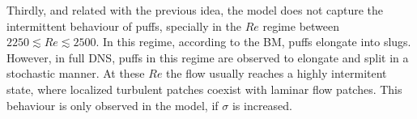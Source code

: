 \documentclass{article}
\begin{document}
Thirdly, and related with the previous idea, the model does not capture the intermittent behaviour of puffs, specially in the $Re$ regime between $2250 \lesssim Re \lesssim 2500$. In this regime, according to the BM, puffs elongate into slugs. However, in full DNS, puffs  in this regime are observed to elongate and split in a stochastic manner. At these $Re$ the flow usually reaches a highly intermitent state, where localized turbulent patches coexist with laminar flow patches. This behaviour is only observed in the model, if $\sigma$ is increased.






\end{document}
